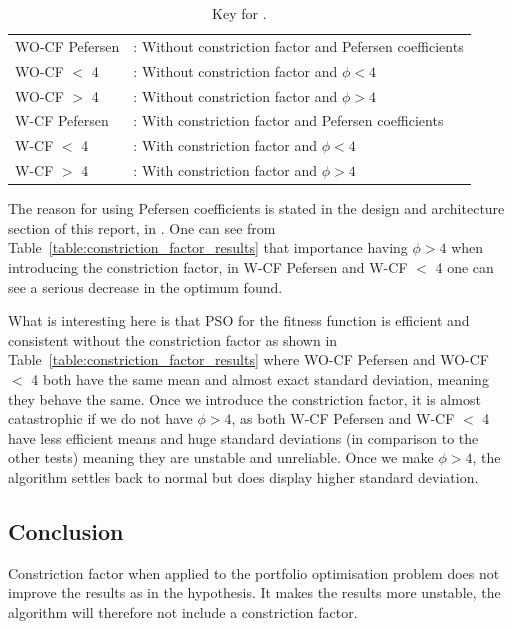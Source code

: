 \documentclass{pdfmx4020}
\begin{document}
        \begin{table}[H]
          \setlength{\extrarowheight}{2.0pt}
          \begin{tabular}{ l l }
            WO-CF Pefersen & : Without constriction factor and Pefersen coefficients  \\
            WO-CF $<$ 4 & : Without constriction factor and $\phi < 4$ \\
            WO-CF $>$ 4 & : Without constriction factor and $\phi > 4$ \\
            W-CF Pefersen & : With constriction factor and Pefersen coefficients  \\
            W-CF $<$ 4 & : With constriction factor and $\phi < 4$ \\
            W-CF $>$ 4 & : With constriction factor and $\phi > 4$ \\
          \end{tabular}
          \caption{Key for .}
          \label{table:key_constriction_factor_results}
        \end{table}

      The reason for using Pefersen coefficients is stated in the design and architecture section of this report,  in . One can see from Table~\ref{table:constriction_factor_results} that importance having $\phi > 4$ when introducing the constriction factor, in W-CF Pefersen and W-CF $<$ 4 one can see a serious decrease in the optimum found. 

      What is interesting here is that PSO for the fitness function is efficient and consistent without the constriction factor as shown in Table~\ref{table:constriction_factor_results} where WO-CF Pefersen and WO-CF $<$ 4 both have the same mean and almost exact standard deviation, meaning they behave the same. Once we introduce the constriction factor, it is almost catastrophic if we do not have $\phi > 4$, as both W-CF Pefersen and W-CF $<$ 4 have less efficient means and huge standard deviations (in comparison to the other tests) meaning they are unstable and unreliable. Once we make $\phi > 4$, the algorithm settles back to normal but does display higher standard deviation. 
    \subsection{Conclusion} %
    \label{sub:conclusion}
      Constriction factor when applied to the portfolio optimisation problem does not improve the results as in the hypothesis. It makes the results more unstable, the algorithm will therefore not include a constriction factor. 
\end{document}
